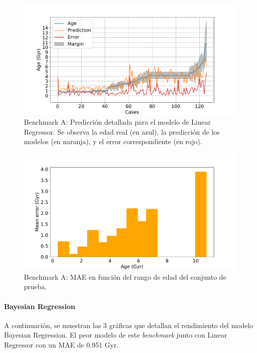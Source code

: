 \begin{figure}[H]
\begin{center}
 \includegraphics[width=0.8\linewidth]{Figuras/Experimentos/B_A_lr_2.pdf}
\end{center}
\caption{Benchmark A: Predicción detallada para el modelo de Linear Regressor. Se observa la edad real (en azul), la predicción de los modelos (en naranja), y el error correspondiente (en rojo).}
 \label{fig:benchA_details_lr_2}
\end{figure}

\begin{figure}[H]
\begin{center}
 \includegraphics[width=0.8\linewidth]{Figuras/Experimentos/B_A_lr_3.pdf}
\end{center}
\caption{Benchmark A: MAE en función del rango de edad del conjunto de prueba.}
 \label{fig:benchA_details_lr_3}
\end{figure}

\paragraph{Bayesian Regression} 
A continuación, se muestran las 3 gráficas que detallan el rendimiento del modelo Bayesian Regression. El peor modelo de este \emph{benchmark} junto con Linear Regressor con un MAE de 0.951 Gyr.

